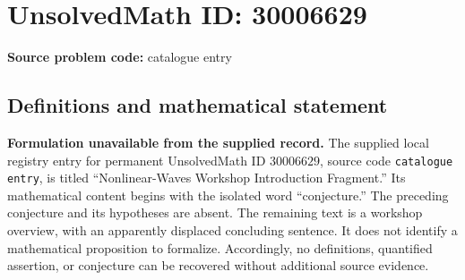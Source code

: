 \documentclass[11pt]{article}
\begin{document}
\section*{UnsolvedMath ID: 30006629}
\textbf{Source problem code:} catalogue entry
\subsection{Definitions and mathematical statement}
\textbf{Formulation unavailable from the supplied record.} The supplied local registry entry for permanent UnsolvedMath ID \(30006629\), source code \texttt{catalogue entry}, is titled ``Nonlinear-Waves Workshop Introduction Fragment.'' Its mathematical content begins with the isolated word ``conjecture.'' The preceding conjecture and its hypotheses are absent. The remaining text is a workshop overview, with an apparently displaced concluding sentence. It does not identify a mathematical proposition to formalize. Accordingly, no definitions, quantified assertion, or conjecture can be recovered without additional source evidence.
\end{document}
